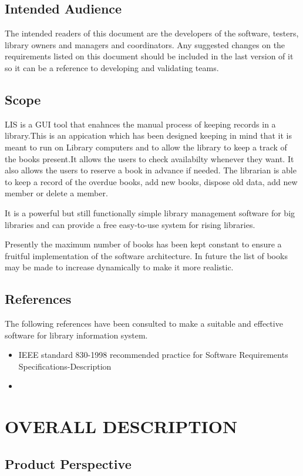 \documentclass{article}
\begin{document}
\subsection{Intended Audience}
The intended readers of this document are the developers of the software, testers, library owners
and managers and coordinators.
Any suggested changes on the requirements listed on this document should be included in
the last version of it so it can be a reference to developing and validating teams.
\subsection{Scope}
LIS is a GUI tool that enahnces the manual process of keeping records in a library.This is an appication which has been designed keeping in mind that it is meant to run on Library computers and to allow the library to keep a track of the books present.It allows the users to check availabilty whenever they want. It also allows the users to reserve a book in advance if needed. The librarian is able to keep a record of the overdue books, add new books, dispose old data, add new member or delete a member. 

It is a powerful but still functionally simple library management software for big libraries and can provide a free easy-to-use system for rising libraries.

Presently the maximum number of books has been kept constant to ensure a fruitful implementation of the software architecture. In future the list of books may be made to increase dynamically to make it more realistic.
\subsection{References}
The following references have been consulted to make a suitable and effective software for library information system.

\begin{itemize}
\item IEEE standard 830-1998 recommended practice for Software Requirements Specifications-Description
\item 
\end{itemize}


\section{OVERALL DESCRIPTION}
\subsection{Product Perspective}
\end{document}
